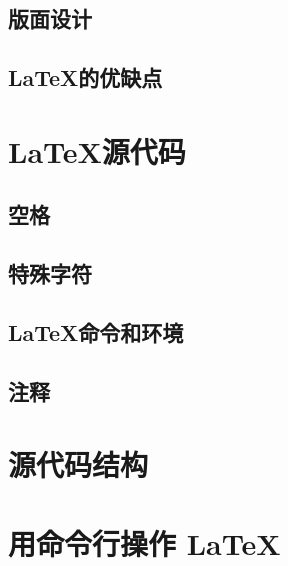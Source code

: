\subsection{版面设计}

\leavevmode\nobreakspace

\subsection{\LaTeX 的优缺点}

\leavevmode\nobreakspace

\section{\LaTeX 源代码}

\leavevmode\nobreakspace

\subsection{空格}

\leavevmode\nobreakspace

\subsection{特殊字符}

\leavevmode\nobreakspace

\subsection{\LaTeX 命令和环境}

\leavevmode\nobreakspace

\subsection{注释}

\leavevmode\nobreakspace

\section{源代码结构}

\leavevmode\nobreakspace

\section{用命令行操作 \LaTeX}

\leavevmode\nobreakspace

